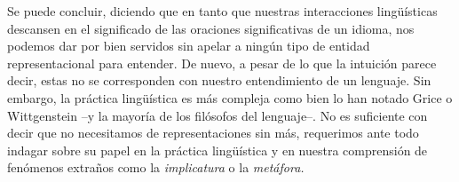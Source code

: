 \documentclass[]{book}
\begin{document}
\begin{refsection}
Se puede concluir, diciendo que en tanto que nuestras interacciones
lingüísticas descansen en el significado de las oraciones significativas
de un idioma, nos podemos dar por bien servidos sin apelar a ningún tipo
de entidad representacional para entender. De nuevo, a pesar de lo que
la intuición parece decir, estas no se corresponden con nuestro
entendimiento de un lenguaje. Sin embargo, la práctica lingüística es
más compleja como bien lo han notado Grice o Wittgenstein --y la mayoría
de los filósofos del lenguaje--. No es suficiente con decir que no
necesitamos de representaciones sin más, requerimos ante todo indagar
sobre su papel en la práctica lingüística y en nuestra comprensión de
fenómenos extraños como la \emph{implicatura} o la \emph{metáfora. }

\nocite{Dummett1993}
\nocite{Frege1998}
\nocite{Grice1989}
\nocite{Lycan1999}
\nocite{Pitt2017}
\nocite{Tomasello2003}
\nocite{Travis2006}
\nocite{Travis2011}
\nocite{Wayne2014}
\nocite{Wittgenstein2008}

\printbibliography[heading=subbibliography,title={Referencias}]

\end{refsection}
\end{document}
